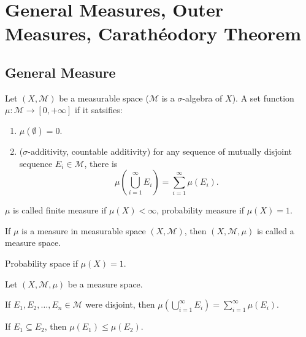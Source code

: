 \documentclass[class=book, crop=false]{standalone}
\begin{document}
    \section{General Measures, Outer Measures, Carath\'{e}odory Theorem}
        \subsection{General Measure}
        \begin{definition}[Measure]
            Let $(X, \mathscr{M})$ be a measurable space ($\mathscr{M}$ is a $\sigma$-algebra of $X$). A set function $\mu : \mathscr{M} \rightarrow [0, +\infty]$ if it satsifies:
            \begin{enumerate}
                \item $\mu(\emptyset) = 0$.
                \item ($\sigma$-additivity, countable additivity) for any sequence of mutually disjoint sequence $E_i \in \mathscr{M}$, there is
                \begin{equation*}
                    \mu\left(\bigcup^{\infty}_{i = 1} E_i\right) = \sum^{\infty}_{i = 1} \mu(E_i).
                \end{equation*}
            \end{enumerate}
        \end{definition}
        \begin{remark}
            $\mu$ is called finite measure if $\mu(X) < \infty$, probability measure if $\mu(X) = 1$.
        \end{remark}

        \begin{definition}
            If $\mu$ is a measure in measurable space $(X, \mathscr{M})$, then $(X, \mathscr{M}, \mu)$ is called a measure space.
        \end{definition}
        \begin{remark}
            Probability space if $\mu(X) = 1$.
        \end{remark}

        \noexpand Let $(X, \mathscr{M}, \mu)$ be a measure space.
        \begin{theorem}
            If $E_1, E_2, \dots, E_n \in \mathscr{M}$ were disjoint, then $\mu\left(\bigcup^{\infty}_{i = 1} E_i\right) = \sum^{\infty}_{i = 1} \mu(E_i)$.
        \end{theorem}
        
        \begin{theorem}[Monotonicity]
            If $E_1 \subseteq E_2$, then $\mu(E_1) \leq \mu(E_2)$.
        \end{theorem}
        
\end{document}
